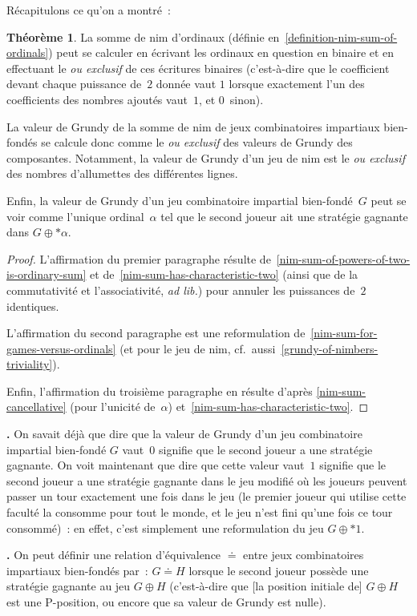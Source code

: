 \documentclass[12pt,a4paper]{article}
\theoremstyle{definition}
\newcommand\thingy{%
\refstepcounter{comcnt}\smallskip\noindent\textbf{\thecomcnt.} }
\newtheorem{thm}[comcnt]{Théorème}
\begin{document}
Récapitulons ce qu'on a montré :

\begin{thm}\label{summary-of-grundy-theory}
La somme de nim d'ordinaux (définie
en \ref{definition-nim-sum-of-ordinals}) peut se calculer en écrivant
les ordinaux en question en binaire et en effectuant le \emph{ou
  exclusif} de ces écritures binaires (c'est-à-dire que le coefficient
devant chaque puissance de $2$ donnée vaut $1$ lorsque exactement l'un
des coefficients des nombres ajoutés vaut $1$, et $0$ sinon).

La valeur de Grundy de la somme de nim de jeux combinatoires
impartiaux bien-fondés se calcule donc comme le \emph{ou exclusif} des
valeurs de Grundy des composantes.  Notamment, la valeur de Grundy
d'un jeu de nim est le \emph{ou exclusif} des nombres d'allumettes des
différentes lignes.

Enfin, la valeur de Grundy d'un jeu combinatoire impartial
bien-fondé $G$ peut se voir comme l'unique ordinal $\alpha$ tel que le
second joueur ait une stratégie gagnante dans $G \oplus *\alpha$.
\end{thm}
\begin{proof}
L'affirmation du premier paragraphe résulte
de \ref{nim-sum-of-powers-of-two-is-ordinary-sum} et
de \ref{nim-sum-has-characteristic-two} (ainsi que de la commutativité
et l'associativité, \textit{ad lib.}) pour annuler les puissances
de $2$ identiques.

L'affirmation du second paragraphe est une reformulation
de \ref{nim-sum-for-games-versus-ordinals} (et pour le jeu de nim,
cf. aussi \ref{grundy-of-nimbers-triviality}).

Enfin, l'affirmation du troisième paragraphe en résulte d'après
\ref{nim-sum-cancellative} (pour l'unicité de $\alpha$)
et \ref{nim-sum-has-characteristic-two}.
\end{proof}

\thingy On savait déjà que dire que la valeur de Grundy d'un jeu
combinatoire impartial bien-fondé $G$ vaut $0$ signifie que le second
joueur a une stratégie gagnante.  On voit maintenant que dire que
cette valeur vaut $1$ signifie que le second joueur a une stratégie
gagnante dans le jeu modifié où les joueurs peuvent passer un tour
exactement une fois dans le jeu (le premier joueur qui utilise cette
faculté la consomme pour tout le monde, et le jeu n'est fini qu'une
fois ce tour consommé) : en effet, c'est simplement une reformulation
du jeu $G \oplus *1$.

\thingy On peut définir une relation d'équivalence $\doteq$ entre jeux
combinatoires impartiaux bien-fondés par : $G \doteq H$ lorsque le
second joueur possède une stratégie gagnante au jeu $G\oplus H$
(c'est-à-dire que [la position initiale de] $G\oplus H$ est une
P-position, ou encore que sa valeur de Grundy est nulle).
\end{document}
